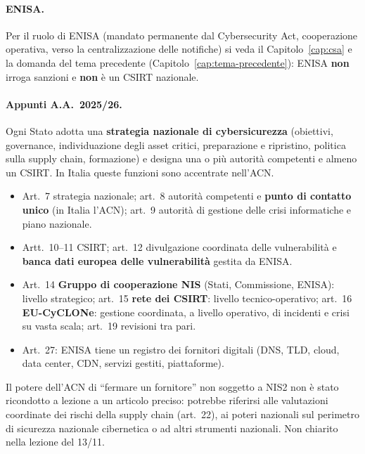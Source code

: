 \paragraph{ENISA.} Per il ruolo di ENISA (mandato permanente dal Cybersecurity Act, cooperazione
operativa, verso la centralizzazione delle notifiche) si veda il Capitolo~\ref{cap:csa} e la domanda
del tema precedente (Capitolo~\ref{cap:tema-precedente}): ENISA \textbf{non} irroga sanzioni e
\textbf{non} è un CSIRT nazionale.

\paragraph{Appunti A.A.~2025/26.} Ogni Stato adotta una \textbf{strategia nazionale di cybersicurezza}
(obiettivi, governance, individuazione degli asset critici, preparazione e ripristino, politica sulla
supply chain, formazione) e designa una o più autorità competenti e almeno un CSIRT. In Italia queste
funzioni sono accentrate nell'ACN.

\begin{integrazione}
\begin{itemize}
  \item Art.~7 strategia nazionale; art.~8 autorità competenti e \textbf{punto di contatto unico}
    (in Italia l'ACN); art.~9 autorità di gestione delle crisi informatiche e piano nazionale.
  \item Artt.~10--11 CSIRT; art.~12 divulgazione coordinata delle vulnerabilità e \textbf{banca dati
    europea delle vulnerabilità} gestita da ENISA.
  \item Art.~14 \textbf{Gruppo di cooperazione NIS} (Stati, Commissione, ENISA): livello strategico;
    art.~15 \textbf{rete dei CSIRT}: livello tecnico-operativo; art.~16 \textbf{EU-CyCLONe}: gestione
    coordinata, a livello operativo, di incidenti e crisi su vasta scala; art.~19 revisioni tra pari.
  \item Art.~27: ENISA tiene un registro dei fornitori digitali (DNS, TLD, cloud, data center, CDN,
    servizi gestiti, piattaforme).
\end{itemize}
\end{integrazione}

\begin{verifica}
Il potere dell'ACN di ``fermare un fornitore'' non soggetto a NIS2 non è stato ricondotto a lezione a
un articolo preciso: potrebbe riferirsi alle valutazioni coordinate dei rischi della supply chain
(art.~22), ai poteri nazionali sul perimetro di sicurezza nazionale cibernetica o ad altri strumenti
nazionali. Non chiarito nella lezione del 13/11.
\end{verifica}

